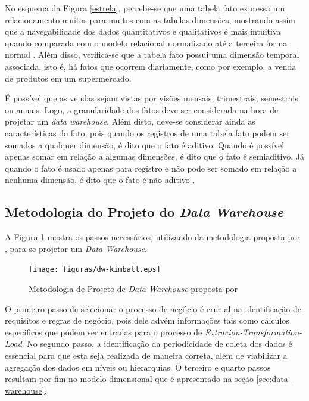 No esquema da Figura \ref{estrela}, percebe-se que uma tabela fato expressa um relacionamento muitos para muitos com as tabelas dimensões, mostrando assim que a navegabilidade dos dados quantitativos e qualitativos é mais intuitiva quando comparada com o modelo relacional normalizado até a terceira forma normal \cite{Kimball2002}. Além disso, verifica-se que a tabela fato possui uma dimensão temporal associada, isto é, há fatos que ocorrem diariamente, como por exemplo, a venda de produtos em um supermercado. 

É possível que as vendas sejam vistas por visões mensais, trimestrais, semestrais ou anuais. Logo, a granularidade dos fatos deve ser considerada na hora de projetar um \textit{data warehouse}. Além disto, deve-se considerar ainda as características do fato, pois quando os registros de uma tabela fato podem ser somados a qualquer dimensão, é dito que o fato é aditivo. Quando é possível apenas somar em relação a algumas dimensões, é dito que o fato é semiaditivo. Já quando o fato é usado apenas para registro e não pode ser somado em relação a nenhuma dimensão, é dito que o fato é não aditivo \cite{Inmon1992}.

\subsection{Metodologia do Projeto do \textit{Data Warehouse}}
\label{sec:metodologia-dw}

A Figura \ref{fig:metodologia-dw} mostra os passos necessários, utilizando da metodologia proposta por , para se projetar um \textit{Data Warehouse}.

\begin{figure}[ht!]
\centering
\texttt{[image: figuras/dw-kimball.eps]}
\caption{Metodologia de Projeto de \textit{Data Warehouse} proposta por }
\label{fig:metodologia-dw}
\end{figure}
\FloatBarrier

O primeiro passo de selecionar o processo de negócio é crucial na identificação de requisitos e regras de negócio, pois dele advém informações tais como cálculos específicos que podem ser entradas para o processo de \textit{Extracion-Transformation-Load}. No segundo passo, a identificação da periodicidade de coleta dos dados é essencial para que esta seja realizada de maneira correta, além de viabilizar a agregação dos dados em níveis ou hierarquias. O terceiro e quarto passos resultam por fim no modelo dimensional que é apresentado na seção \ref{sec:data-warehouse}. 


